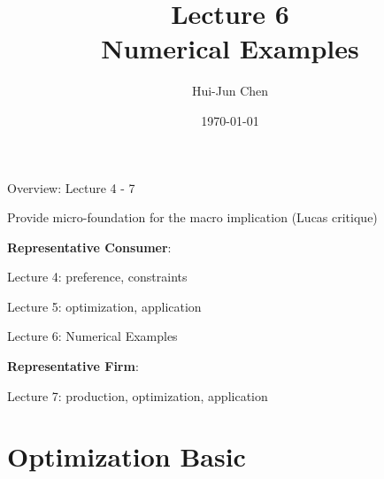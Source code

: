 \documentclass[11pt,aspectratio=169,usenames,dvipsnames]{beamer}
\title[Lecture 6]{Lecture 6 \\ Numerical Examples}
\author[Hui-Jun Chen]{Hui-Jun Chen}
\institute[NTHU]{National Tsing Hua University}
\date{\today}
\let\tempone\itemize
\let\temptwo\enditemize
\renewenvironment{itemize}{\tempone\addtolength{\itemsep}{\fill}}{\temptwo}
\begin{document}
\begin{frame}[plain]
    \titlepage
\end{frame}

\begin{frame}{Overview: Lecture 4 - 7}
\label{slide:Overview__Lecture_4_7}

\begin{center}
Provide \alert{micro-foundation} for the \alert{macro implication} (\alert{Lucas critique})
\end{center}

\begin{itemize}
    \item \textbf{Representative Consumer}:
    \begin{itemize}
        \item Lecture 4: \alert{preference}, \alert{constraints}
        \item Lecture 5: \alert{optimization}, \alert{application}
        \item Lecture 6: Numerical Examples
    \end{itemize}
    \item \textbf{Representative Firm}:
    \begin{itemize}
        \item Lecture 7: \alert{production}, \alert{optimization}, \alert{application}
    \end{itemize}
\end{itemize}
\end{frame}

\section{Optimization Basic}
\label{sec:Optimization_Basic}
\end{document}
